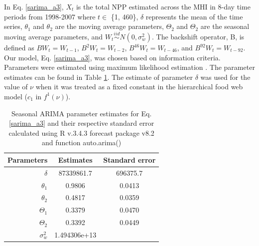 \documentclass[oneside,12pt,final]{sty/ucthesis-CA2012}
\let\cite\citep                             %
\begin{document}
\begin{mainmatter}
In Eq. \ref{sarima_a3}, $X_t$ is the total NPP estimated across the MHI in 8-day time periods from 1998-2007 where $t \in$ \{1, 460\}, $\delta$ represents the mean of the time series, $\theta_1$ and $\theta_2$ are the moving average parameters, $\Theta_2$ and $\Theta_2$ are the seasonal moving average parameters, and $W_t \stackrel{iid}{\sim} N(0,\sigma_w^2)$. The backshift operator, B, is defined as $ BW_t  = W_{t-1}$, $B^2W_t  = W_{t-2}$, $B^{46}W_t  = W_{t-46}$, and $B^{92}W_t  = W_{t-92}$.  Our model, Eq. \ref{sarima_a3}, was chosen based on information criteria. Parameters were estimated using maximum likelihood estimation \cite{forecast1, forecast2}. The parameter estimates can be found in Table \ref{sarima_parameters_a3}. The estimate of parameter $\delta$ was used for the value of $\nu$ when it was treated as a fixed constant in the hierarchical food web model ($c_1$ in $f^1(\nu)$).

\begin{table}[H]
\centering
\caption{Seasonal ARIMA parameter estimates for Eq. \ref{sarima_a3} and their respective standard error calculated using R v.3.4.3 \cite{Rcite} forecast package v8.2 and function auto.arima() \cite{forecast1, forecast2} }
\begin{tabular}{r|c|c}
  \hline \small
 Parameters & Estimates & Standard error \\ 
   \hline
   $\delta$ & 87339861.7 & 696375.7 \\   
   $\theta_1$ & 0.9806 & 0.0413 \\
   $\theta_2$ & 0.4817 & 0.0359 \\
   $\Theta_1$ & 0.3379 & 0.0470 \\
   $\Theta_2$ & 0.3392 & 0.0449 \\
   $\sigma_w^2$ & 1.494306e+13 & \\
   \hline
\end{tabular} 
\label{sarima_parameters_a3}
\end{table}


\end{mainmatter}
\end{document}

